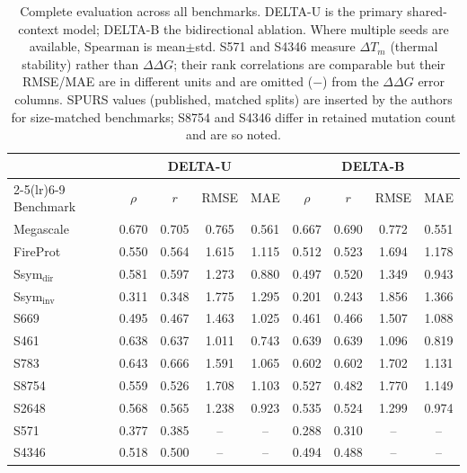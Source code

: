 \begin{table}[t]
\centering
\small
\caption{Complete evaluation across all benchmarks. DELTA-U is the primary shared-context model; DELTA-B the bidirectional ablation. Where multiple seeds are available, Spearman is mean$\pm$std. S571 and S4346 measure $\Delta T_m$ (thermal stability) rather than $\Delta\Delta G$; their rank correlations are comparable but their RMSE/MAE are in different units and are omitted ($-$) from the $\Delta\Delta G$ error columns. SPURS values (published, matched splits) are inserted by the authors for size-matched benchmarks; S8754 and S4346 differ in retained mutation count and are so noted.}
\label{tab:full}
\begin{tabular}{l cccc cccc}
\toprule
 & \multicolumn{4}{c}{DELTA-U} & \multicolumn{4}{c}{DELTA-B} \\
\cmidrule(lr){2-5}\cmidrule(lr){6-9}
Benchmark & $\rho$ & $r$ & RMSE & MAE & $\rho$ & $r$ & RMSE & MAE \\
\midrule
Megascale & 0.670 & 0.705 & 0.765 & 0.561 & 0.667 & 0.690 & 0.772 & 0.551 \\
FireProt & 0.550 & 0.564 & 1.615 & 1.115 & 0.512 & 0.523 & 1.694 & 1.178 \\
Ssym$_\mathrm{dir}$ & 0.581 & 0.597 & 1.273 & 0.880 & 0.497 & 0.520 & 1.349 & 0.943 \\
Ssym$_\mathrm{inv}$ & 0.311 & 0.348 & 1.775 & 1.295 & 0.201 & 0.243 & 1.856 & 1.366 \\
S669 & 0.495 & 0.467 & 1.463 & 1.025 & 0.461 & 0.466 & 1.507 & 1.088 \\
S461 & 0.638 & 0.637 & 1.011 & 0.743 & 0.639 & 0.639 & 1.096 & 0.819 \\
S783 & 0.643 & 0.666 & 1.591 & 1.065 & 0.602 & 0.602 & 1.702 & 1.131 \\
S8754 & 0.559 & 0.526 & 1.708 & 1.103 & 0.527 & 0.482 & 1.770 & 1.149 \\
S2648 & 0.568 & 0.565 & 1.238 & 0.923 & 0.535 & 0.524 & 1.299 & 0.974 \\
S571 & 0.377 & 0.385 & -- & -- & 0.288 & 0.310 & -- & -- \\
S4346 & 0.518 & 0.500 & -- & -- & 0.494 & 0.488 & -- & -- \\
\bottomrule
\end{tabular}
\end{table}
